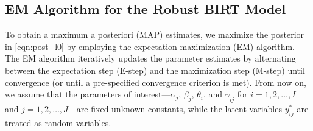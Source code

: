 \documentclass[11pt]{article}
\begin{document}
\subsection{EM Algorithm for the Robust BIRT Model}\label{sub_sec_3.2}
To obtain a maximum a posteriori (MAP) estimates, we maximize the posterior in \eqref{eqn:post_l0} by employing the expectation-maximization (EM) algorithm. The EM algorithm iteratively updates the parameter estimates by alternating between the expectation step (E-step) and the maximization step (M-step) until convergence (or until a pre-specified convergence criterion is met). 
From now on, we assume that the parameters of interest—$ \alpha_j $, $ \beta_j $, $ \theta_i $, and $ \gamma_{ij} $ for $ i = 1, 2, \ldots, I $ and $ j = 1, 2, \ldots, J $—are fixed unknown constants, while the latent variables $ y_{ij}^* $ are treated as random variables.
\end{document}
